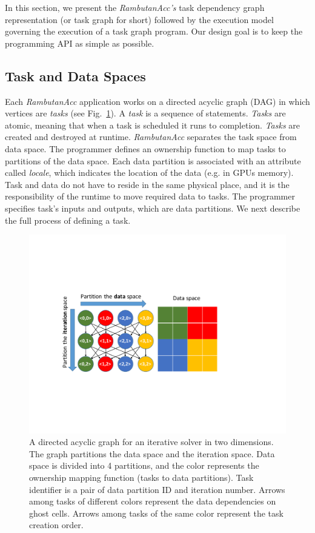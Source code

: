 In this section, we present the {\em RambutanAcc's} task dependency graph representation (or task graph for short) followed by the execution model governing the execution of a task graph program.
Our design goal is to keep the programming API as simple as possible.


\subsection{Task and Data Spaces}
Each {\em RambutanAcc} application works on a directed acyclic graph (DAG) in which vertices are {\em tasks} (see Fig.~\ref{fig:taskGraph}).
A {\em task} is a sequence of statements.
{\em Tasks} are atomic, meaning that when a task is scheduled it runs to completion.
{\em Tasks} are created and destroyed at runtime.
{\em RambutanAcc} separates the task space from data space.
The programmer defines an ownership function to map tasks to partitions of the data space.
Each data partition is associated with an attribute called {\em locale}, which indicates the location of the data (e.g. in GPUs memory).
Task and data do not have to reside in the same physical place, and it is the responsibility of the runtime to move required data to tasks.
The programmer specifies task's inputs and outputs, which are data partitions.
We next describe the full process of defining a task.


\begin{figure}[htb]
\centering
\includegraphics[width=.47\textwidth]{figures/taskGraph.pdf}
\caption{A directed acyclic graph for an iterative solver in two dimensions. The graph partitions the data space and the iteration space. Data space is divided into 4 partitions, and the color represents the ownership mapping function (tasks to data partitions). Task identifier is a pair of data partition ID and iteration number. Arrows among tasks of different colors represent the data dependencies on ghost cells. Arrows among tasks of the same color represent the task creation order.} 
\label{fig:taskGraph}
\end{figure}


